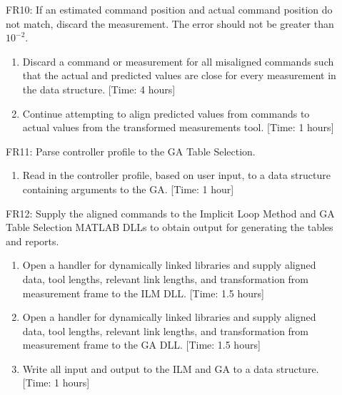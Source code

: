 \documentclass[pdftex,10pt,a4paper]{article}
\begin{document}
\begin{description}
\item[] FR10: If an estimated command position and actual command position do not match, discard the measurement. The error should not be greater than $10^{-2}$.
\begin{enumerate}
\item Discard a command or measurement for all misaligned commands such that the actual and predicted values are close for every measurement in the data structure. [Time: 4 hours]
\item Continue attempting to align predicted values from commands to actual values from the transformed measurements tool. [Time: 1 hours]
\end{enumerate}

\item[] FR11: Parse controller profile to the GA Table Selection.
\begin{enumerate}
\item Read in the controller profile, based on user input, to a data structure containing arguments to the GA. [Time: 1 hour]
\end{enumerate}

\item[] FR12: Supply the aligned commands to the Implicit Loop Method and GA Table Selection MATLAB DLLs to obtain output for generating the tables and reports.
\begin{enumerate}
\item Open a handler for dynamically linked libraries and supply aligned data, tool lengths, relevant link lengths, and transformation from measurement frame to the ILM DLL. [Time: 1.5 hours]
\item Open a handler for dynamically linked libraries and supply aligned data, tool lengths, relevant link lengths, and transformation from measurement frame to the GA DLL. [Time: 1.5 hours]
\item Write all input and output to the ILM and GA to a data structure. [Time: 1 hours]
\end{enumerate}


\end{description}
\end{document}
